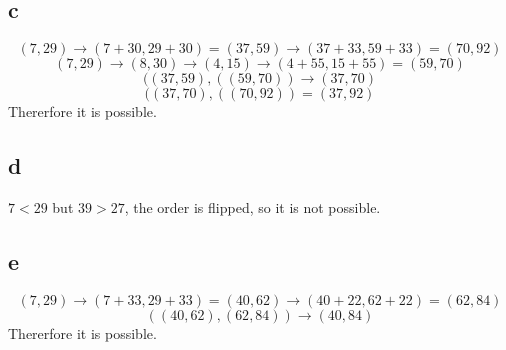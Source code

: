 \documentclass[12pt]{article}
\begin{document}
\subsection{c}
$$(7,29) \to (7+30,29+30) = (37, 59) \to (37+33,59+33) = (70, 92)$$
$$(7,29) \to (8,30) \to (4, 15) \to (4+55, 15+55) = (59,70)$$
$$((37, 59), ((59,70)) \to (37, 70)$$
$$((37, 70), ((70, 92)) = (37, 92)$$
Thererfore it is possible.

\subsection{d}
$7 < 29$ but $39 > 27$, the order is flipped, so it is not possible.

\subsection{e}
$$(7,29) \to (7+33,29+33) = (40, 62) \to (40+22,62+22) = (62, 84)$$
$$((40, 62), (62, 84)) \to (40, 84)$$
Thererfore it is possible.
\end{document}
